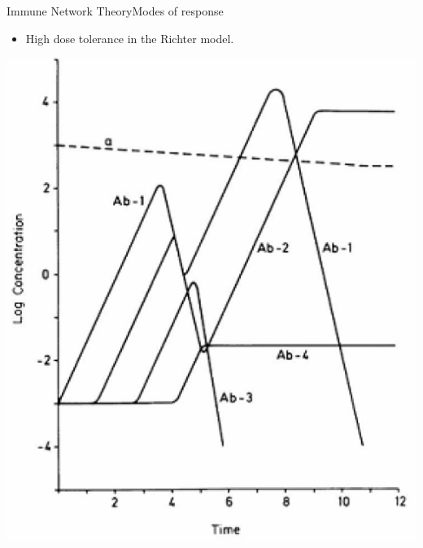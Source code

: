 \begin{frame}{Immune Network Theory}{Modes of response}
  \begin{itemize}
  \item \large
     High dose tolerance in the Richter model.
  \end{itemize}
  \par
  \centering
    \includegraphics[scale=0.5] {img/high_dose_tolerance.png}
  \par
\end{frame}

